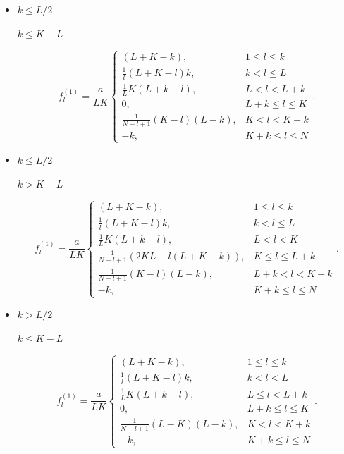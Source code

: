 \documentclass[specialist,
               substylefile = spbu.rtx,
               subf,href,colorlinks=true, 12pt]{disser}
\begin{document}
\begin{itemize}
\item
$k \leq L/2$

$k \leq K - L$

$$f^{(1)}_l = \frac{a}{{LK}}
\begin{cases}
	(L + K - k), & \text{$1 \leq l \leq k$}\\
	\frac{1}{l}(L + K - l)k, & \text{$k < l \leq L$}\\
	\frac{1}{L}K(L + k - l), &\text{$L < l < L + k$}\\
	0, &\text{$L + k \leq l \leq K$}\\
	\frac{1}{N - l + 1}(K - l)(L - k), &\text{$K < l < K + k$}\\
	-k, &\text{$K + k \leq l \leq N $}
\end{cases}.
$$

\item
$k \leq L/2$

$k > K - L$

$$f^{(1)}_l = \frac{a}{{LK}}
\begin{cases}
	(L + K - k), & \text{$1 \leq l \leq k$}\\
	\frac{1}{l}(L + K - l)k, & \text{$k < l \leq L$}\\
	\frac{1}{L}K(L + k- l), &\text{$L < l < K$}\\
	\frac{1}{N - l + 1}(2KL - l(L + K - k)), &\text{$K \leq l \leq L + k$}\\
	\frac{1}{N - l + 1}( K - l)(L - k), &\text{$L + k < l < K + k$}\\
	-k, &\text{$K + k \leq l \leq N$}
\end{cases}.
$$

\item
$k > L/2$

$k \leq K - L$

$$f^{(1)}_l = \frac{a}{{LK}}
\begin{cases}
	(L + K - k), & \text{$1 \leq l \leq k$}\\
	\frac{1}{l}(L + K - l)k, & \text{$k < l < L$}\\
	\frac{1}{L}K(L + k - l), &\text{$L \leq l < L + k$}\\
	0, &\text{$L + k \leq l \leq K$}\\
	\frac{1}{N - l + 1}(L - K)(L - k), &\text{$K < l < K + k$}\\
	-k, &\text{$K + k \leq l \leq N$}
\end{cases}.
$$


\end{itemize}
\end{document}
